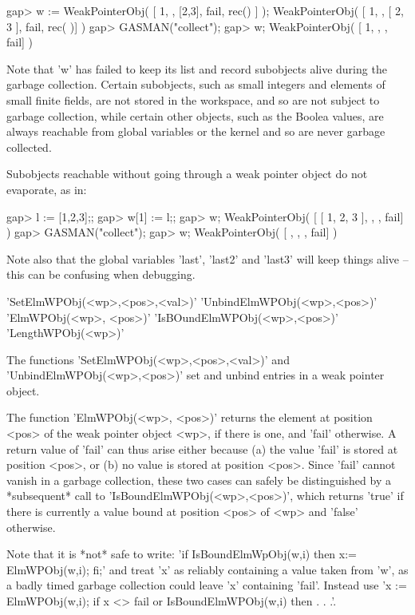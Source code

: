 \begintt
    gap> w := WeakPointerObj( [ 1, , [2,3], fail, rec() ] );
    WeakPointerObj( [ 1, , [ 2, 3 ], fail, rec(
       )] )
    gap> GASMAN("collect");
    gap> w;
    WeakPointerObj( [ 1, , , fail] )
\endtt

Note that 'w' has failed to keep its list  and record subobjects alive during
the garbage collection.  Certain   subobjects,  such as small   integers  and
elements of small finite fields, are not stored  in the workspace, and so are
not subject to  garbage collection, while  certain other objects, such as the
Boolea values,  are always reachable from global  variables or the kernel and
so are never garbage collected.

Subobjects reachable without  going  through  a weak  pointer object  do  not
evaporate, as in:

\begintt
   gap> l := [1,2,3];;
   gap> w[1] := l;;
   gap> w;
   WeakPointerObj( [ [ 1, 2, 3 ], , , fail] )
   gap> GASMAN("collect");
   gap> w;                
   WeakPointerObj( [ , , , fail] )
\endtt

Note also  that the global  variables  'last', 'last2' and 'last3'  will keep
things alive -- this can be confusing when debugging.


\>'SetElmWPObj(<wp>,<pos>,<val>)'
\>'UnbindElmWPObj(<wp>,<pos>)'
\>'ElmWPObj(<wp>, <pos>)'
\>'IsBOundElmWPObj(<wp>,<pos>)'
\>'LengthWPObj(<wp>)'

The          functions           'SetElmWPObj(<wp>,<pos>,<val>)'          and
'UnbindElmWPObj(<wp>,<pos>)' set and unbind entries in a weak pointer object.

The function 'ElmWPObj(<wp>, <pos>)' returns the element at position <pos> of
the weak pointer object <wp>, if there is one, and 'fail' otherwise. A return
value of 'fail' can thus arise either because (a)  the value 'fail' is stored
at position <pos>, or (b) no value is stored  at position <pos>. Since 'fail'
cannot   vanish in  a  garbage collection,   these   two cases can  safely be
distinguished by  a *subsequent* call to 'IsBoundElmWPObj(<wp>,<pos>)', which
returns 'true' if there is currently a value bound at  position <pos> of <wp>
and 'false' otherwise.

Note that it  is  *not*  safe to write:   'if IsBoundElmWpObj(w,i)  then  x:=
ElmWPObj(w,i); fi;'  and treat 'x' as  reliably containing a value taken from
'w', as a badly  timed garbage collection could  leave 'x' containing 'fail'. 
Instead use 'x := ElmWPObj(w,i); if x <> fail or  IsBoundElmWPObj(w,i) then . 
. .'.

